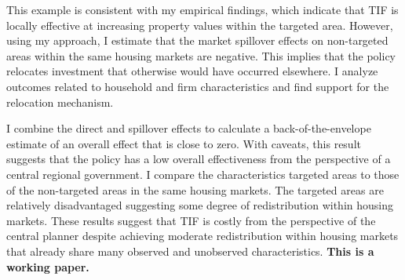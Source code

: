 This example is consistent with my empirical findings, which indicate that TIF is locally effective at increasing property values within the targeted area. However, using my approach, I estimate that the market spillover effects on non-targeted areas within the same housing markets are negative. This implies that the policy relocates investment that otherwise would have occurred elsewhere. I analyze outcomes related to household and firm characteristics and find support for the relocation mechanism. 

I combine the direct and spillover effects to calculate a back-of-the-envelope estimate of an overall effect that is close to zero. With caveats, this result suggests that the policy has a low overall effectiveness from the perspective of a central regional government. I compare the characteristics targeted areas to those of the non-targeted areas in the same housing markets. The targeted areas are relatively disadvantaged suggesting some degree of redistribution within housing markets. These results suggest that TIF is costly from the perspective of the central planner despite achieving moderate redistribution within housing markets that already share many observed and unobserved characteristics. \textbf{This is a working paper.}





